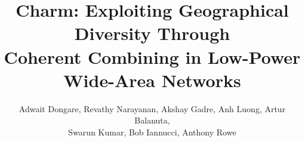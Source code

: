 \documentclass[sigconf]{acmart}
\begin{document}



\acmISBN{}



\title{ Charm: Exploiting Geographical Diversity Through \\ Coherent Combining in Low-Power Wide-Area Networks }


\author{Adwait Dongare, Revathy Narayanan, Akshay Gadre, Anh Luong, Artur Balanuta, \\ Swarun Kumar, Bob Iannucci, Anthony Rowe }

\renewcommand{\shortauthors}{Dongare et al.}
\end{document}
